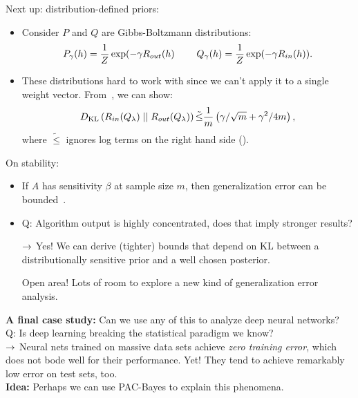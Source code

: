 Next up: distribution-defined priors:
\begin{itemize}
    \item Consider $P$ and $Q$ are Gibbs-Boltzmann distributions:
    \[
    P_\gamma(h) = \frac{1}{Z} \exp(-\gamma R_{out}(h) \hspace{8mm} Q_\gamma(h) = \frac{1}{Z}\exp(-\gamma R_{in}(h)).
    \]
    \item These distributions hard to work with since we can't apply it to a single weight vector. From~\citet{catoni2007pac}, we can show:
    \[
    D_{\text{KL}}\left(R_{in}(Q_\lambda) \mid \mid R_{out}(Q_\lambda)\right) \tilde{\leq} \frac{1}{m} \left(\gamma / \sqrt{m} + \gamma^2/4m\right),
    \]
    where $\tilde{\leq}$ ignores log terms on the right hand side ().
    
\end{itemize}

On stability:
\begin{itemize}
    \item If $A$ has sensitivity $\beta$ at sample size $m$, then generalization error can be bounded~\cite{bousquet2002stability}.
    
    \item Q: Algorithm output is highly concentrated, does that imply stronger results?
    
    $\rightarrow$ Yes! We can derive (tighter) bounds that depend on KL between a distributionally sensitive prior and a well chosen posterior.
    
    Open area! Lots of room to explore a new kind of generalization error analysis.
\end{itemize}

{\bf A final case study:} Can we use any of this to analyze deep neural networks? \\

Q: Is deep learning breaking the statistical paradigm we know? \\

$\rightarrow$ Neural nets trained on massive data sets achieve {\it zero training error}, which does not bode well for their performance. Yet! They tend to achieve remarkably low error on test sets, too. \\

{\bf Idea:} Perhaps we can use PAC-Bayes to explain this phenomena. \\



